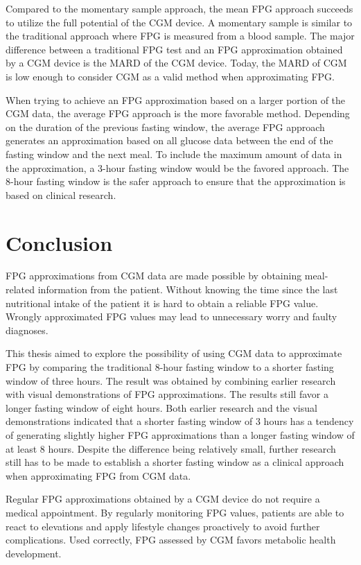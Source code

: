 \documentclass[english, 12pt, a4paper, elec, utf8, a-1b, online]{aaltothesis}
\begin{document}
Compared to the momentary sample approach, the mean FPG approach succeeds to utilize the full potential of the CGM device.
A momentary sample is similar to the traditional approach where FPG is measured from a blood sample. The major difference between a 
traditional FPG test and an FPG approximation obtained by a CGM device is 
the MARD of the CGM device\cite{rodbard_continuous_2016}. Today, the MARD of CGM is low enough to consider CGM as a valid method when 
approximating FPG\cite{rodbard_continuous_2016}.

When trying to achieve an FPG approximation based on a larger portion of the
CGM data, the average FPG approach is the more favorable method. Depending on the duration of the previous fasting window, the average 
FPG approach generates an approximation based on all glucose data between the end of the fasting window and the next meal. To include the maximum
amount of data in the approximation, a 3-hour fasting window would be the favored approach. The 8-hour fasting window is the safer approach
to ensure that the approximation is based on clinical research\cite{mathew_blood_2022}.
\clearpage


\section{Conclusion}
FPG approximations from CGM data are made possible by obtaining meal-related information from the patient. Without knowing the time since the last nutritional intake of the patient it is hard to obtain a reliable FPG value. Wrongly approximated FPG values may lead to unnecessary worry and faulty diagnoses.


This thesis aimed to explore the possibility of using CGM data to approximate
FPG by comparing the traditional 8-hour fasting window to a shorter fasting window
of three hours. The result was obtained by combining earlier research with visual 
demonstrations of FPG approximations. The results still favor a longer fasting window of eight hours. Both earlier research and the visual demonstrations indicated that a shorter fasting window
of 3 hours has a tendency of generating slightly higher FPG approximations than a longer fasting window of at least 8 hours. Despite the difference being relatively small, further research still has to be made to establish a shorter fasting window as a clinical approach when approximating FPG
from CGM data.

Regular FPG approximations obtained by a CGM device do not require a medical appointment. 
By regularly monitoring FPG values, patients are able to react to elevations and apply lifestyle changes proactively to avoid further complications. Used correctly, FPG assessed by CGM favors 
metabolic health development. 
\clearpage



\clearpage

\end{document}
